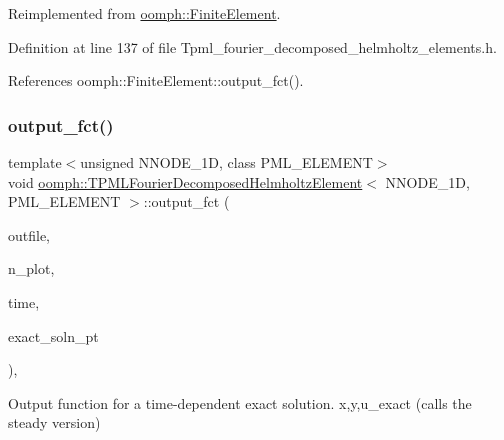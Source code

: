 Reimplemented from \hyperlink{classoomph_1_1FiniteElement_a22b695c714f60ee6cd145be348042035}{oomph\+::\+Finite\+Element}.



Definition at line 137 of file Tpml\+\_\+fourier\+\_\+decomposed\+\_\+helmholtz\+\_\+elements.\+h.



References oomph\+::\+Finite\+Element\+::output\+\_\+fct().

\mbox{\label{classoomph_1_1TPMLFourierDecomposedHelmholtzElement_a72f800e47f97fbbf21bf108e0fa5e39b}} 
\subsubsection{\texorpdfstring{output\+\_\+fct()}{output\_fct()}\hspace{0.1cm}{\footnotesize\ttfamily [2/2]}}
{\footnotesize\ttfamily template$<$unsigned N\+N\+O\+D\+E\+\_\+1D, class P\+M\+L\+\_\+\+E\+L\+E\+M\+E\+NT$>$ \\
void \hyperlink{classoomph_1_1TPMLFourierDecomposedHelmholtzElement}{oomph\+::\+T\+P\+M\+L\+Fourier\+Decomposed\+Helmholtz\+Element}$<$ N\+N\+O\+D\+E\+\_\+1D, P\+M\+L\+\_\+\+E\+L\+E\+M\+E\+NT $>$\+::output\+\_\+fct (\begin{DoxyParamCaption}\item[{std\+::ostream \&}]{outfile,  }\item[{const unsigned \&}]{n\+\_\+plot,  }\item[{const double \&}]{time,  }\item[{\hyperlink{classoomph_1_1FiniteElement_ad4ecf2b61b158a4b4d351a60d23c633e}{Finite\+Element\+::\+Unsteady\+Exact\+Solution\+Fct\+Pt}}]{exact\+\_\+soln\+\_\+pt }\end{DoxyParamCaption})\hspace{0.3cm}{\ttfamily [inline]}, {\ttfamily [virtual]}}



Output function for a time-\/dependent exact solution. x,y,u\+\_\+exact (calls the steady version) 



